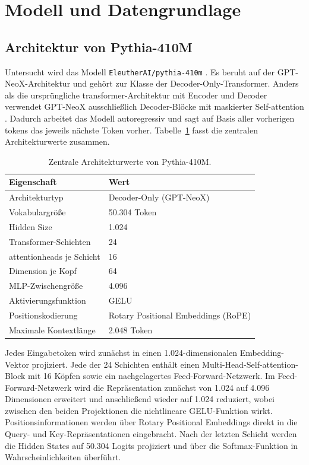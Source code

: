 \section{Modell und Datengrundlage}

\subsection{Architektur von Pythia-410M}

Untersucht wird das Modell \texttt{EleutherAI/pythia-410m} \cite{biderman2023pythia}. Es beruht auf der GPT-NeoX-Architektur und gehört zur Klasse der Decoder-Only-Transformer. Anders als die ursprüngliche \gls{transformer}-Architektur mit Encoder und Decoder verwendet GPT-NeoX ausschließlich Decoder-Blöcke mit maskierter Self-\gls{attention} \cite{vaswani2017attention}. Dadurch arbeitet das Modell autoregressiv und sagt auf Basis aller vorherigen \glspl{token} das jeweils nächste Token vorher. Tabelle~\ref{tab:arch} fasst die zentralen Architekturwerte zusammen.

\begin{table}[htbp]
  \centering
  \caption{Zentrale Architekturwerte von Pythia-410M.}
  \label{tab:arch}
  \begin{tabular}{ll}
    \toprule
    Eigenschaft & Wert \\
    \midrule
    Architekturtyp & Decoder-Only (GPT-NeoX) \\
    Vokabulargröße & 50.304 Token \\
    Hidden Size & 1.024 \\
    Transformer-Schichten & 24 \\
    \glspl{attentionhead} je Schicht & 16 \\
    Dimension je Kopf & 64 \\
    MLP-Zwischengröße & 4.096 \\
    Aktivierungsfunktion & GELU \\
    Positionskodierung & Rotary Positional Embeddings (RoPE) \\
    Maximale Kontextlänge & 2.048 Token \\
    \bottomrule
  \end{tabular}
\end{table}

Jedes Eingabetoken wird zunächst in einen 1.024-dimensionalen Embedding-Vektor projiziert. Jede der 24 Schichten enthält einen Multi-Head-Self-\gls{attention}-Block mit 16 Köpfen sowie ein nachgelagertes Feed-Forward-Netzwerk. Im Feed-Forward-Netzwerk wird die Repräsentation zunächst von 1.024 auf 4.096 Dimensionen erweitert und anschließend wieder auf 1.024 reduziert, wobei zwischen den beiden Projektionen die nichtlineare GELU-Funktion wirkt. Positionsinformationen werden über Rotary Positional Embeddings direkt in die Query- und Key-Repräsentationen eingebracht. Nach der letzten Schicht werden die Hidden States auf 50.304 Logits projiziert und über die Softmax-Funktion in Wahrscheinlichkeiten überführt.

